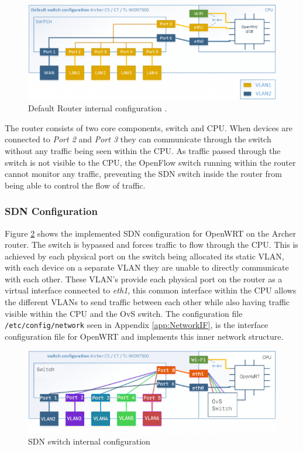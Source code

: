 \documentclass[12pt, oneside]{book}
\begin{document}
\begin{figure}[H]
	\centering
	\includegraphics[scale=0.65]{images/routerinside.png}
	\caption{Default Router internal configuration \cite{openwrtprojectRouter}.}
	\label{fig:routerdef}
\end{figure}

The router consists of two core components, switch and CPU. When devices are connected to \emph{Port 2} and \emph{Port 3}
they can communicate through the switch without any traffic being seen within the CPU. As traffic passed through the switch
is not visible to the CPU, the OpenFlow switch running within the router cannot monitor any traffic,
preventing the SDN switch inside the router from being able to control the flow of traffic.


\subsubsection{SDN Configuration}
Figure \ref{fig:routerVLAN} shows the implemented SDN configuration for OpenWRT on the Archer router.
The switch is bypassed and forces traffic to flow through the CPU. This is achieved by each physical port on the switch 
being allocated its static VLAN, with each device on a separate VLAN they are unable to directly 
communicate with each other. These VLAN's provide each physical port on the router as a virtual 
interface connected to \emph{eth1}, this common interface within the CPU allows the different VLANs to send traffic between each other
while also having traffic visible within the CPU and the OvS switch.
The configuration file \lstinline{/etc/config/network} seen in Appendix \ref{app:NetworkIF}, is the interface
configuration file for OpenWRT and implements this inner network structure.

\begin{figure}[H]
	\centering
	\includegraphics[scale=0.65]{images/routerinsideSDN.png}
	\caption{SDN switch internal configuration}
	\label{fig:routerVLAN}
\end{figure}
\end{document}
